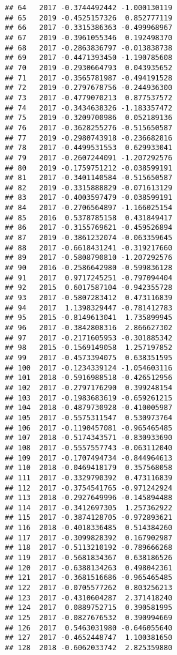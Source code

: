 \documentclass[
]{article}
\begin{document}
\begin{verbatim}
## 64   2017 -0.3744492442 -1.000130119
## 65   2019 -0.4525157326  0.852777119
## 66   2017 -0.3315386363 -0.499968967
## 67   2019 -0.3961055346  0.192498370
## 68   2017 -0.2863836797 -0.013838738
## 69   2017 -0.4471393450 -1.190785608
## 70   2019 -0.2930664793  0.043935652
## 71   2017 -0.3565781987 -0.494191528
## 72   2019 -0.2797678756 -0.244936300
## 73   2017 -0.4779070213  0.877537572
## 74   2017 -0.3434638326 -1.183357472
## 75   2019 -0.3209700986  0.052189136
## 76   2017 -0.3628255276 -0.515650587
## 77   2019 -0.2980743918 -0.236682816
## 78   2017 -0.4499531553  0.629933041
## 79   2017 -0.2607244091 -1.207292576
## 80   2019 -0.1759751212 -0.038599191
## 81   2017 -0.3401140584 -0.515650587
## 82   2019 -0.3315888829 -0.071613129
## 83   2017 -0.4003597479 -0.038599191
## 84   2017 -0.2706564897 -1.166025154
## 85   2016  0.5378785158  0.431849417
## 86   2017 -0.3155769621 -0.459526894
## 87   2019 -0.3861232074 -0.063359645
## 88   2017 -0.6618431241 -0.319217660
## 89   2017 -0.5808790810 -1.207292576
## 90   2016 -0.2586642980 -0.599836128
## 91   2017  0.9717245251 -0.797094404
## 92   2015  0.6017587104 -0.942355728
## 93   2017 -0.5807283412  0.473116839
## 94   2017  1.1398329447 -0.781412783
## 95   2015 -0.8149613041  1.735899945
## 96   2017 -0.3842808316  2.866627302
## 97   2017 -0.2171605953 -0.301885342
## 98   2015 -0.1569149058  1.257197852
## 99   2017 -0.4573394075  0.638351595
## 100  2017 -0.1234339124 -1.054603116
## 101  2018 -0.5916988518 -0.426512956
## 102  2017 -0.2797176290  0.399248154
## 103  2017 -0.1983683619 -0.659261215
## 104  2018 -0.4879730928 -0.410005987
## 105  2017 -0.5575311547  0.530973764
## 106  2017 -0.1190457081 -0.965465485
## 107  2018 -0.5174343571 -0.830933690
## 108  2017 -0.5557557743 -0.063112040
## 109  2017 -0.1707494734 -0.844964613
## 110  2018 -0.0469418179  0.357568058
## 111  2017 -0.3329790392  0.473116839
## 112  2017 -0.3754541765 -0.971242924
## 113  2018 -0.2927649996 -0.145894488
## 114  2017 -0.3412697305  1.257362922
## 115  2017 -0.3874128705 -0.972893621
## 116  2018 -0.4018336485  0.514384260
## 117  2017 -0.3099828392  0.167902987
## 118  2017 -0.5113210192 -0.789666268
## 119  2017 -0.5681834367  0.638186526
## 120  2017 -0.6388134263  0.498042361
## 121  2017 -0.3681516686 -0.965465485
## 122  2017 -0.0705577262  0.803256213
## 123  2017 -0.4310604287  2.371418240
## 124  2017  0.0889752715  0.390581995
## 125  2017 -0.0827676532  0.390994669
## 126  2017  0.5463031980 -0.646055640
## 127  2017 -0.4652448747  1.100381650
## 128  2018 -0.6062033742  2.825359880

\end{verbatim}
\end{document}
